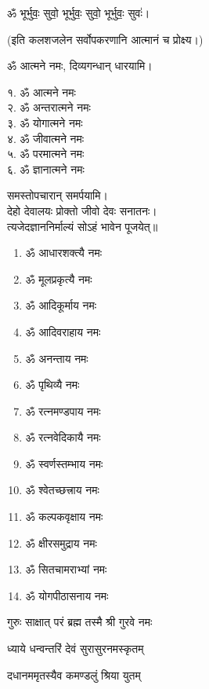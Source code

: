 \centerline{ॐ भूर्भुवः॒ सुवो॒ भूर्भुवः॒ सुवो॒ भूर्भुवः॒ सुवः॑।}

(इति कलशजलेन सर्वोपकरणानि आत्मानं च प्रोक्ष्य।)

ॐ आत्मने नमः, दिव्यगन्धान् धारयामि।
\begin{multicols}{2}
१. ॐ आत्मने नमः\\
२. ॐ अन्तरात्मने नमः\\
३. ॐ योगात्मने नमः\\
४. ॐ जीवात्मने नमः\\
५. ॐ परमात्मने नमः\\
६. ॐ ज्ञानात्मने नमः
\end{multicols}
समस्तोपचारान् समर्पयामि।\\

देहो देवालयः प्रोक्तो जीवो देवः सनातनः।\\
त्यजेदज्ञाननिर्माल्यं सोऽहं भावेन पूजयेत्॥\\

\begin{multicols}{2}
\begin{enumerate}
\item ॐ आधारशक्त्यै नमः
\item ॐ मूलप्रकृत्यै नमः
\item ॐ आदिकूर्माय नमः 
\item ॐ आदिवराहाय नमः
\item ॐ अनन्ताय नमः
\item ॐ पृथिव्यै नमः
\item ॐ रत्नमण्डपाय नमः
\item ॐ रत्नवेदिकायै नमः
\item ॐ स्वर्णस्तम्भाय नमः
\item ॐ श्वेतच्छत्त्राय नमः
\item ॐ कल्पकवृक्षाय नमः
\item ॐ क्षीरसमुद्राय नमः 
\item ॐ सितचामराभ्यां नमः
\item ॐ योगपीठासनाय नमः
\end{enumerate}
\end{multicols}

{गुरुः साक्षात् परं ब्रह्म तस्मै श्री गुरवे नमः}

\centering

{ध्याये धन्वन्तरिं देवं सुरासुरनमस्कृतम्}

{दधानममृतस्यैव कमण्डलुं श्रिया युतम्}

